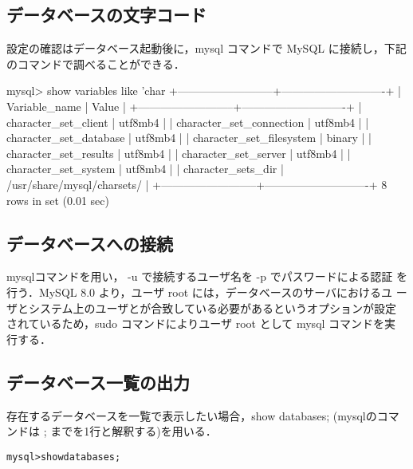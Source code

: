 \subsection*{データベースの文字コード}

設定の確認はデータベース起動後に，mysql コマンドで MySQL に接続し，下記
のコマンドで調べることができる．

\begin{cli}
mysql> show variables like 'char%
+--------------------------+----------------------------+
| Variable_name            | Value                      |
+--------------------------+----------------------------+
| character_set_client     | utf8mb4                    |
| character_set_connection | utf8mb4                    |
| character_set_database   | utf8mb4                    |
| character_set_filesystem | binary                     |
| character_set_results    | utf8mb4                    |
| character_set_server     | utf8mb4                    |
| character_set_system     | utf8mb4                    |
| character_sets_dir       | /usr/share/mysql/charsets/ |
+--------------------------+----------------------------+
8 rows in set (0.01 sec)
\end{cli}

\subsection*{データベースへの接続}
mysqlコマンドを用い， -u で接続するユーザ名を -p でパスワードによる認証
を行う．MySQL 8.0 より，ユーザ root には，データベースのサーバにおけるユ
ーザとシステム上のユーザとが合致している必要があるというオプションが設定
されているため，sudo コマンドによりユーザ root として mysql コマンドを実
行する．
	\begin{center}
	\end{center}
	
\subsection*{データベース一覧の出力}
存在するデータベースを一覧で表示したい場合，show databases; (mysqlのコマンドは ; までを1行と解釈する)を用いる．
	\begin{center}
	\begin{breakbox}
	\begin{alltt}
		mysql> show databases;
	\end{alltt}
	\end{breakbox}
	\end{center}

